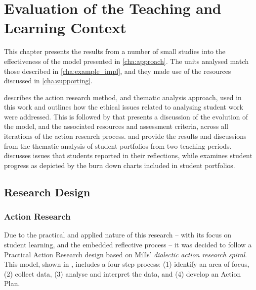 
\chapter{Evaluation of the Teaching and Learning Context} %
\label{cha:evaluation}

\graphicspath{{Figures/Evaluation/}}

This chapter presents the results from a number of small studies into the effectiveness of the model presented in \cref{cha:approach}. The units analysed match those described in \cref{cha:example_impl}, and they made use of the resources discussed in \cref{cha:supporting}. 

 describes the action research method, and thematic analysis approach, used in this work and outlines how the ethical issues related to analysing student work were addressed. This is followed by  that presents a discussion of the evolution of the model, and the associated resources and assessment criteria, across all iterations of the action research process.  and  provide the results and discussions from the thematic analysis of student portfolios from two teaching periods.  discusses issues that students reported in their reflections, while  examines student progress as depicted by the burn down charts included in student portfolios. 

\clearpage
\section{Research Design} %
\label{sec:research_design}

\subsection{Action Research} %
\label{sub:action_research}

Due to the practical and applied nature of this research -- with its focus on student learning, and the embedded reflective process -- it was decided to follow a Practical Action Research \cite{Creswell:2008} design based on Mills' \cite{Mills:2010} \emph{dialectic action research spiral}. This model, shown in , includes a four step process: (1) identify an area of focus, (2) collect data, (3) analyse and interpret the data, and (4) develop an Action Plan.

